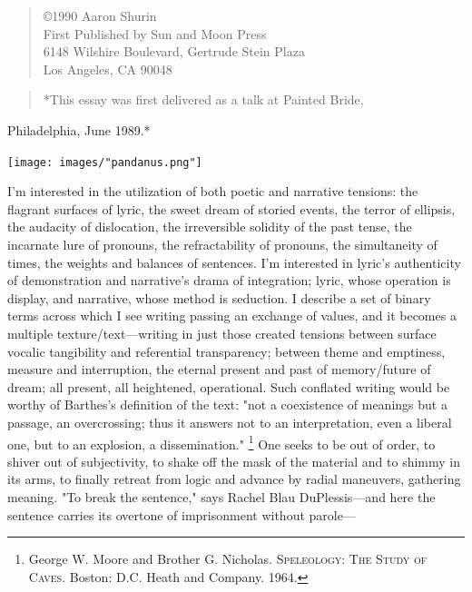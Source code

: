 \documentclass[
]{memoir}
\begin{document}
\begin{verse}
©1990 Aaron Shurin\\
First Published by Sun and Moon Press\\
6148 Wilshire Boulevard, Gertrude Stein Plaza\\
Los Angeles, CA 90048\\
\end{verse}

\begin{verse}
*This essay was first delivered as a talk at Painted Bride,\\
\end{verse}

Philadelphia, June 1989.*

\begin{center}\texttt{[image: images/"pandanus.png"]}\end{center}

I'm interested in the utilization of both poetic and narrative tensions:
the flagrant surfaces of lyric, the sweet dream of storied events, the
terror of ellipsis, the audacity of dislocation, the irreversible
solidity of the past tense, the incarnate lure of pronouns, the
refractability of pronouns, the simultaneity of times, the weights and
balances of sentences. I'm interested in lyric's authenticity of
demonstration and narrative's drama of integration; lyric, whose
operation is display, and narrative, whose method is seduction. I
describe a set of binary terms across which I see writing passing an
exchange of values, and it becomes a multiple texture/text---writing in
just those created tensions between surface vocalic tangibility and
referential transparency; between theme and emptiness, measure and
interruption, the eternal present and past of memory/future of dream;
all present, all heightened, operational. Such conflated writing would
be worthy of Barthes's definition of the text: "not a coexistence of
meanings but a passage, an overcrossing; thus it answers not to an
interpretation, even a liberal one, but to an explosion, a
dissemination." \footnote{George W. Moore and Brother G. Nicholas.
  \textsc{Speleology: The Study of Caves}. Boston: D.C. Heath and
  Company. 1964.} One seeks to be out of order, to shiver out of
subjectivity, to shake off the mask of the material and to shimmy in its
arms, to finally retreat from logic and advance by radial maneuvers,
gathering meaning. "To break the sentence," says Rachel Blau
DuPlessis---and here the sentence carries its overtone of imprisonment
without parole---
\end{document}
